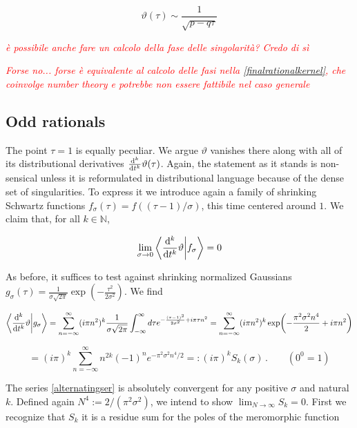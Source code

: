 \documentclass{article}
\newcommand{\cmnt}[1]{\textcolor{red}{\emph{#1}}}
\newcommand{\intR}{\int_{-\infty}^\infty}
\newcommand{\sumZ}{\sum_{n=-\infty}^{\infty}}
\begin{document}
\begin{equation}
    \vartheta(\tau) \sim \frac{1}{\sqrt{p-q\tau}}
\end{equation}

\cmnt{è possibile anche fare un calcolo della fase delle singolarità? Credo di sì}

\cmnt{Forse no... forse è equivalente al calcolo delle fasi nella \eqref{finalrationalkernel}, che coinvolge number theory e potrebbe non essere fattibile nel caso generale}

\subsection{Odd rationals}

The point $\tau=1$ is equally peculiar. We argue $\vartheta$ vanishes there along with all of its distributional derivatives $\dv[k]{t} \vartheta(\tau)$. Again, the statement as it stands is non-sensical unless it is reformulated in distributional language because of the dense set of singularities. To express it we introduce again a family of shrinking Schwartz functions $f_\sigma(\tau) = f((\tau-1)/\sigma)$, this time centered around $1$. We claim that, for all $k \in \mathbb{N}$,

\begin{equation}
    \lim_{\sigma \rightarrow 0} \bra{ \dv[k]{t}\vartheta}\ket{ f_\sigma } = 0
\end{equation}

As before, it suffices to test against shrinking normalized Gaussians $g_\sigma(\tau) = \frac{1}{\sigma\sqrt{2\pi}} \exp( - \frac{\tau^2}{2\sigma^2} )$. We find

\begin{equation}
    \bra{\dv[k]{t}\vartheta}\ket{g_\sigma} = \sumZ (i\pi n^2)^k \frac{1}{\sigma\sqrt{2\pi}} \intR d\tau e^{- \frac{(\tau-1)^2}{2\sigma^2} + i\pi\tau n^2} = \sumZ (i\pi n^2)^k \exp( - \frac{\pi^2 \sigma^2 n^4}{2} + i\pi n^2)
\end{equation}

\begin{equation}\label{alternatingser}
    = (i\pi)^k \sumZ n^{2k} (-1)^n e^{-\pi^2 \sigma^2 n^4/2} =: (i\pi)^k S_k(\sigma)\,.\quad\quad(0^0 = 1)
\end{equation}

The series \eqref{alternatingser} is absolutely convergent for any positive $\sigma$ and natural $k$. Defined again $N^4 := 2/(\pi^2 \sigma^2)$, we intend to show  $\lim_{N \rightarrow \infty} S_k = 0$. First we recognize that $S_k$ it is a residue sum for the poles of the meromorphic function
\end{document}
